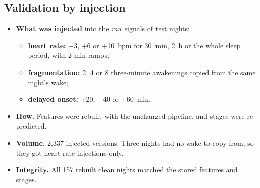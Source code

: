 \documentclass[11pt,a4paper]{article}
\begin{document}
\subsection{Validation by injection}
\begin{itemize}
\item \textbf{What was injected} into the \emph{raw} signals of test nights:
  \begin{itemize}
  \item \textbf{heart rate:} +3, +6 or +10~bpm for 30~min, 2~h or the whole sleep period, with
  2-min ramps;
  \item \textbf{fragmentation:} 2, 4 or 8 three-minute awakenings copied from the same night's
  wake;
  \item \textbf{delayed onset:} +20, +40 or +60~min.
  \end{itemize}
\item \textbf{How.} Features were rebuilt with the unchanged pipeline, and stages were
re-predicted.
\item \textbf{Volume.} 2,337 injected versions. Three nights had no wake to copy from, so they
got heart-rate injections only.
\item \textbf{Integrity.} All 157 rebuilt clean nights matched the stored features and stages.
\end{itemize}
\end{document}
